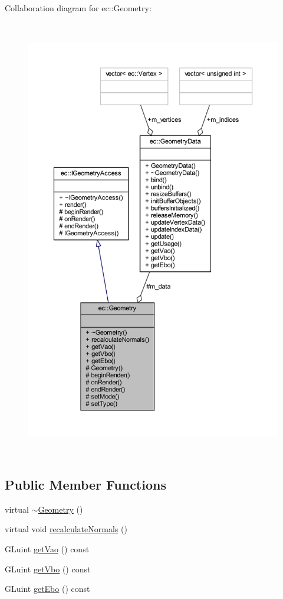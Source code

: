 Collaboration diagram for ec\+:\+:Geometry\+:\nopagebreak
\begin{figure}[H]
\begin{center}
\leavevmode
\includegraphics[height=550pt]{classec_1_1_geometry__coll__graph}
\end{center}
\end{figure}
\subsection*{Public Member Functions}
\begin{DoxyCompactItemize}
\item 
virtual \mbox{\hyperlink{classec_1_1_geometry_a964c581313da2be51a3c78d3be7f48b3}{$\sim$\+Geometry}} ()
\item 
virtual void \mbox{\hyperlink{classec_1_1_geometry_a228d4a0fa01a17379f24aee2c769b501}{recalculate\+Normals}} ()
\item 
G\+Luint \mbox{\hyperlink{classec_1_1_geometry_a91a89baad39d4f2b2c4e9774d952dce9}{get\+Vao}} () const
\item 
G\+Luint \mbox{\hyperlink{classec_1_1_geometry_abad5d4311d16462099b8f9d084d99dd4}{get\+Vbo}} () const
\item 
G\+Luint \mbox{\hyperlink{classec_1_1_geometry_a5d956ff01a7b6648ede8982e0a461ae0}{get\+Ebo}} () const
\end{DoxyCompactItemize}
